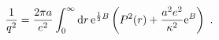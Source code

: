 \begin{equation}
\frac{1}{q^2}=
{2\pi a\over e^2}\int_0^\infty{\rm d}r\,{\rm e}^{{1\over 2}B}
\left(P^2(r)+{a^2e^2\over \kappa^2}{\rm e}^B\right)~.
\label{coupl}
\end{equation}

